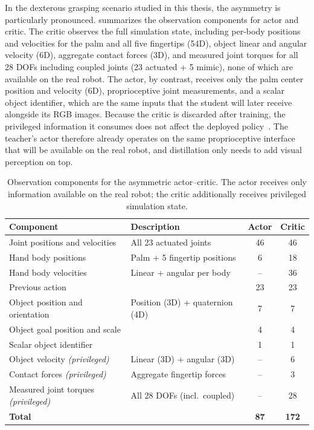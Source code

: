 In the dexterous grasping scenario studied in this thesis, the asymmetry is particularly pronounced.
 summarizes the observation components for actor and critic.
The critic observes the full simulation state, including per-body positions and velocities for the palm and all five fingertips (54D), object linear and angular velocity (6D), aggregate contact forces (3D), and measured joint torques for all 28 DOFs including coupled joints (23 actuated + 5 mimic), none of which are available on the real robot.
The actor, by contrast, receives only the palm center position and velocity (6D), proprioceptive joint measurements, and a scalar object identifier, which are the same inputs that the student will later receive alongside its RGB images.
Because the critic is discarded after training, the privileged information it consumes does not affect the deployed policy~\cite{Pinto2018}.
The teacher's actor therefore already operates on the same proprioceptive interface that will be available on the real robot, and distillation only needs to add visual perception on top.

\begin{table}[htb]
    \centering
    \caption{Observation components for the asymmetric actor--critic. The actor receives only information available on the real robot; the critic additionally receives privileged simulation state.}
    \label{tab:ac_observations}
    \small
    \begin{tabular}{lp{5cm}cc}
        \toprule
        \textbf{Component} & \textbf{Description} & \textbf{Actor} & \textbf{Critic} \\
        \midrule
        Joint positions and velocities & All 23 actuated joints & 46 & 46 \\
        Hand body positions & Palm + 5 fingertip positions & 6  & 18 \\
        Hand body velocities & Linear + angular per body & --  & 36 \\
        Previous action & & 23 & 23 \\
        Object position and orientation & Position (3D) + quaternion (4D) & 7  & 7  \\
        Object goal position and scale & & 4  & 4  \\
        Scalar object identifier & & 1  & 1  \\
        \midrule
        Object velocity \emph{(privileged)} & Linear (3D) + angular (3D) & -- & 6  \\
        Contact forces \emph{(privileged)} & Aggregate fingertip forces & -- & 3  \\
        Measured joint torques \emph{(privileged)} & All 28 DOFs (incl.\ coupled) & -- & 28 \\
        \midrule
        \textbf{Total} & & \textbf{87} & \textbf{172} \\
        \bottomrule
    \end{tabular}
\end{table}

